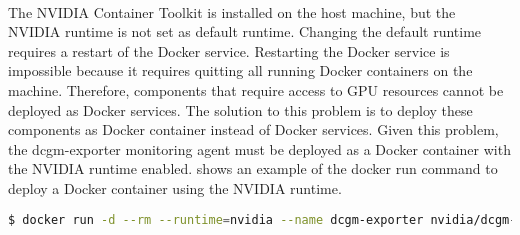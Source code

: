 \paragraph{}
The NVIDIA Container Toolkit is installed on the host machine, but the NVIDIA runtime is not set as default runtime.
Changing the default runtime requires a restart of the Docker service. Restarting the Docker service is impossible because it requires quitting all running Docker containers on the machine. Therefore, components that require access to GPU resources cannot be deployed as Docker services.
The solution to this problem is to deploy these components as Docker container instead of Docker services.
Given this problem, the dcgm-exporter monitoring agent must be deployed as a Docker container with the NVIDIA runtime enabled.
 shows an example of the docker run command to deploy a Docker container using the NVIDIA runtime.
\begin{lstlisting}[label=lst:06_env_prob_cmd, caption=Docker run command to deploy a container using the NVIDIA runtime, language=sh, numbers=none]
$ docker run -d --rm --runtime=nvidia --name dcgm-exporter nvidia/dcgm-exporter:latest
\end{lstlisting}



